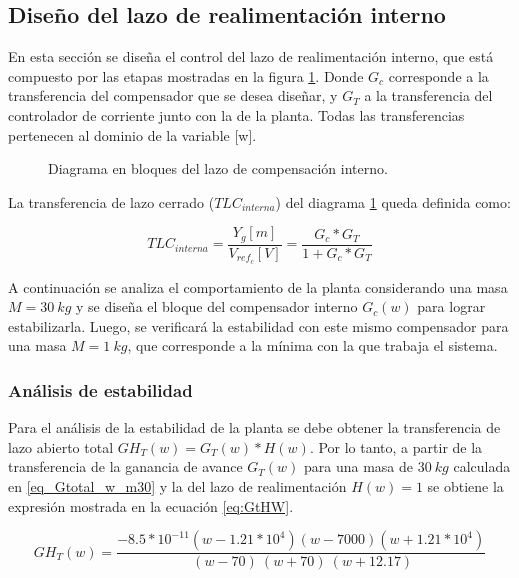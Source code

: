 \subsection{Diseño del lazo de realimentación interno}

En esta sección se diseña el control del lazo de realimentación interno, que está compuesto por las etapas mostradas en la figura \ref{fig:diag-interno_dig}. Donde $G_c$ corresponde a la transferencia del compensador que se desea diseñar, y $G_{T}$ a la transferencia del controlador de corriente junto con la de la planta. Todas las transferencias pertenecen al dominio de la variable [w].

\begin{figure}[H]
	\centering
	
	\caption{Diagrama en bloques del lazo de compensación interno.}	\label{fig:diag-interno_dig}
\end{figure}


La transferencia de lazo cerrado ($TLC_{interna}$) del diagrama \ref{fig:diag-interno_dig} queda definida como:

\begin{equation}
	TLC_{interna}=\frac{Y_g[m]}{V_{ref_c}[V]}=\frac{G_c*G_T}{1+G_c*G_T}
\end{equation}

A continuación se analiza el comportamiento de la planta considerando una masa $M=30\:kg$ y se diseña el bloque del compensador interno $G_c(w)$ para lograr estabilizarla. Luego, se verificará la estabilidad con este mismo compensador para una masa $M=1\:kg$, que corresponde a la mínima con la que trabaja el sistema.

\subsubsection{Análisis de estabilidad}

 Para el análisis de la estabilidad de la planta se debe obtener la transferencia de lazo abierto total $GH_T(w)=G_T(w)*H(w)$. Por lo tanto, a partir de la transferencia de la ganancia de avance $G_{T}(w)$ para una masa de $30\:kg$ calculada en \ref{eq_Gtotal_w_m30} y la del lazo de realimentación $H(w)=1$ se obtiene la expresión mostrada en la ecuación \ref{eq:GtHW}.
 
\begin{equation}
	\label{eq:GtHW}  
	GH_{T}(w)=\frac{-8.5*10^{-11}(w-1.21*10^4)(w-7000)(w+1.21*10^4)}{\ (w-70)\ (w+70)\ (w+12.17)} 
\end{equation} 
 
